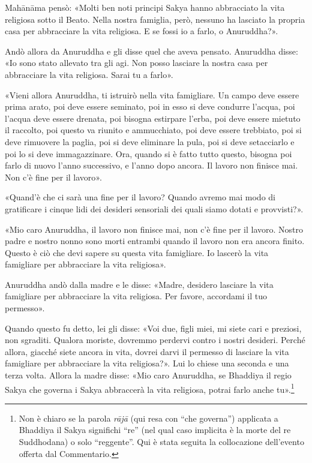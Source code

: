 Mahānāma pensò: «Molti ben noti principi Sakya hanno abbracciato la vita
religiosa sotto il Beato. Nella nostra famiglia, però, nessuno ha
lasciato la propria casa per abbracciare la vita religiosa. E se fossi
io a farlo, o Anuruddha?».


Andò allora da Anuruddha e gli disse quel che aveva pensato. Anuruddha
disse: «Io sono stato allevato tra gli agi. Non posso lasciare la nostra
casa per abbracciare la vita religiosa. Sarai tu a farlo».


«Vieni allora Anuruddha, ti istruirò nella vita famigliare. Un campo
deve essere prima arato, poi deve essere seminato, poi in esso si deve
condurre l’acqua, poi l’acqua deve essere drenata, poi bisogna estirpare
l’erba, poi deve essere mietuto il raccolto, poi questo va riunito e
ammucchiato, poi deve essere trebbiato, poi si deve rimuovere la paglia,
poi si deve eliminare la pula, poi si deve setacciarlo e poi lo si deve
immagazzinare. Ora, quando si è fatto tutto questo, bisogna poi farlo di
nuovo l’anno successivo, e l’anno dopo ancora. Il lavoro non finisce
mai. Non c’è fine per il lavoro».


«Quand’è che ci sarà una fine per il lavoro? Quando avremo mai modo di
gratificare i cinque lidi dei desideri sensoriali dei quali siamo dotati
e provvisti?».


«Mio caro Anuruddha, il lavoro non finisce mai, non c’è fine per il
lavoro. Nostro padre e nostro nonno sono morti entrambi quando il lavoro
non era ancora finito. Questo è ciò che devi sapere su questa vita
famigliare. Io lascerò la vita famigliare per abbracciare la vita
religiosa».


Anuruddha andò dalla madre e le disse: «Madre, desidero lasciare la vita
famigliare per abbracciare la vita religiosa. Per favore, accordami il
tuo permesso».


Quando questo fu detto, lei gli disse: «Voi due, figli miei, mi siete
cari e preziosi, non sgraditi. Qualora moriste, dovremmo perdervi contro
i nostri desideri. Perché allora, giacché siete ancora in vita, dovrei
darvi il permesso di lasciare la vita famigliare per abbracciare la vita
religiosa?». Lui lo chiese una seconda e una terza volta. Allora la
madre disse: «Mio caro Anuruddha, se Bhaddiya il regio Sakya che governa
i Sakya abbraccerà la vita religiosa, potrai farlo anche
tu».\footnote{Non è chiaro se la parola \emph{rājā} (qui resa con “che governa”) applicata a Bhaddiya il Sakya significhi “re” (nel qual caso implicita è la morte del re Suddhodana) o solo “reggente”. Qui è stata seguita la collocazione dell’evento offerta dal Commentario.}


